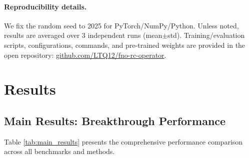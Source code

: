 \documentclass[11pt]{article}
\begin{document}
\paragraph{Reproducibility details.} We fix the random seed to 2025 for PyTorch/NumPy/Python. Unless noted, results are averaged over 3 independent runs (mean$\pm$std). Training/evaluation scripts, configurations, commands, and pre-trained weights are provided in the open repository: \href{https://github.com/LTQ12/fno-rc-operator}{github.com/LTQ12/fno-rc-operator}.

\section{Results}

\subsection{Main Results: Breakthrough Performance}

Table \ref{tab:main_results} presents the comprehensive performance comparison across all benchmarks and methods.
\end{document}
